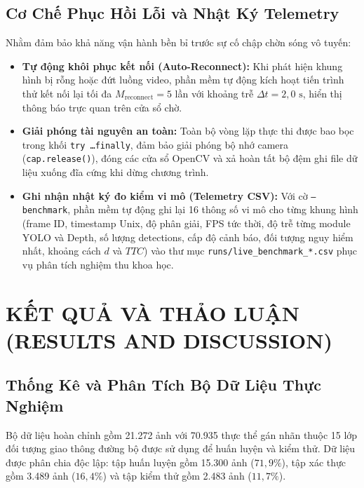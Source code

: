 \subsection{Cơ Chế Phục Hồi Lỗi và Nhật Ký Telemetry}
\label{subsec:auto_reconnect_telemetry}

Nhằm đảm bảo khả năng vận hành bền bỉ trước sự cố chập chờn sóng vô tuyến:
\begin{itemize}
    \item \textbf{Tự động khôi phục kết nối (Auto-Reconnect):} Khi phát hiện khung hình bị rỗng hoặc đứt luồng video, phần mềm tự động kích hoạt tiến trình thử kết nối lại tối đa $M_{\text{reconnect}} = 5$ lần với khoảng trễ $\Delta t = 2,0\text{ s}$, hiển thị thông báo trực quan trên cửa sổ chờ.
    \item \textbf{Giải phóng tài nguyên an toàn:} Toàn bộ vòng lặp thực thi được bao bọc trong khối \texttt{try \dots finally}, đảm bảo giải phóng bộ nhớ camera (\texttt{cap.release()}), đóng các cửa sổ OpenCV và xả hoàn tất bộ đệm ghi file dữ liệu xuống đĩa cứng khi dừng chương trình.
    \item \textbf{Ghi nhận nhật ký đo kiểm vi mô (Telemetry CSV):} Với cờ \texttt{--benchmark}, phần mềm tự động ghi lại 16 thông số vi mô cho từng khung hình (frame ID, timestamp Unix, độ phân giải, FPS tức thời, độ trễ từng module YOLO và Depth, số lượng detections, cấp độ cảnh báo, đối tượng nguy hiểm nhất, khoảng cách $d$ và $TTC$) vào thư mục \texttt{runs/live\_benchmark\_*.csv} phục vụ phân tích nghiệm thu khoa học.
\end{itemize}


\section{KẾT QUẢ VÀ THẢO LUẬN (RESULTS AND DISCUSSION)}
\label{sec:ket_qua_va_thao_luan}

\subsection{Thống Kê và Phân Tích Bộ Dữ Liệu Thực Nghiệm}
\label{subsec:thong_ke_bo_du_lieu}

Bộ dữ liệu hoàn chỉnh gồm 21.272 ảnh với 70.935 thực thể gán nhãn thuộc 15 lớp đối tượng giao thông đường bộ được sử dụng để huấn luyện và kiểm thử. Dữ liệu được phân chia độc lập: tập huấn luyện gồm 15.300 ảnh ($71,9\%$), tập xác thực gồm 3.489 ảnh ($16,4\%$) và tập kiểm thử gồm 2.483 ảnh ($11,7\%$).

